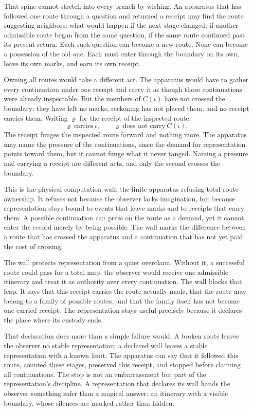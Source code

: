 That spine cannot stretch into every branch by wishing. An apparatus that has followed one route through a question and returned a receipt may find the route suggesting neighbors: what would happen if the next stage changed, if another admissible route began from the same question, if the same route continued past its present return. Each such question can become a new route. None can become a possession of the old one. Each must enter through the boundary on its own, leave its own marks, and earn its own receipt.

Owning all routes would take a different act. The apparatus would have to gather every continuation under one receipt and carry it as though those continuations were already inspectable. But the members of $C(\iota)$ have not crossed the boundary: they have left no marks, reckoning has not placed them, and no receipt carries them. Writing $\varrho$ for the receipt of the inspected route,
\[ \varrho \ \text{carries} \ \iota, \qquad \varrho \ \text{does not carry} \ C(\iota). \]
The receipt funges the inspected route forward and nothing more. The apparatus may name the pressure of the continuations, since the demand for representation points toward them, but it cannot funge what it never tanged. Naming a pressure and carrying a receipt are different acts, and only the second crosses the boundary.

This is the physical computation wall: the finite apparatus refusing total-route-ownership. It refuses not because the observer lacks imagination, but because representation stays bound to events that leave marks and to receipts that carry them. A possible continuation can press on the route as a demand, yet it cannot enter the record merely by being possible. The wall marks the difference between a route that has crossed the apparatus and a continuation that has not yet paid the cost of crossing.

The wall protects representation from a quiet overclaim. Without it, a successful route could pass for a total map: the observer would receive one admissible itinerary and treat it as authority over every continuation. The wall blocks that leap. It says that this receipt carries the route actually made, that the route may belong to a family of possible routes, and that the family itself has not become one carried receipt. The representation stays useful precisely because it declares the place where its custody ends.

That declaration does more than a simple failure would. A broken route leaves the observer no stable representation; a declared wall leaves a stable representation with a known limit. The apparatus can say that it followed this route, counted these stages, preserved this receipt, and stopped before claiming all continuations. The stop is not an embarrassment but part of the representation's discipline. A representation that declares its wall hands the observer something safer than a magical answer: an itinerary with a visible boundary, whose silences are marked rather than hidden.


